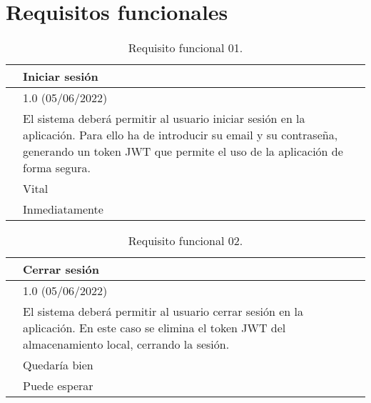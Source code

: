 \section{Requisitos funcionales}
\label{APRequisitosFuncionales}

\begin{table}[H]
\begin{center}
\begin{tabular}{|p{3cm}|p{10cm}|} \hline
\centering {\bf FRQ-01} & Iniciar sesión  \\ \hline\hline
\centering {\bf Versión} & 1.0 (05/06/2022) \\ \hline
\centering {\bf Descripción} & El sistema deberá permitir al usuario iniciar sesión en la aplicación. Para ello ha de introducir su email y su contraseña, generando un token JWT que permite el uso de la aplicación de forma segura. \\ \hline
\centering {\bf Importancia} & Vital \\ \hline
\centering {\bf Urgencia} & Inmediatamente \\ \hline
\end{tabular}
\caption{Requisito funcional 01.}
\label{enlaceFRQ1}
\end{center}
\end{table}

\begin{table}[H]
\begin{center}
\begin{tabular}{|p{3cm}|p{10cm}|} \hline
\centering {\bf FRQ-02} & Cerrar sesión  \\ \hline\hline
\centering {\bf Versión} & 1.0 (05/06/2022) \\ \hline
\centering {\bf Descripción} & El sistema deberá permitir al usuario cerrar sesión en la aplicación. En este caso se elimina el token JWT del almacenamiento local, cerrando la sesión. \\ \hline
\centering {\bf Importancia} & Quedaría bien \\ \hline
\centering {\bf Urgencia} & Puede esperar \\ \hline
\end{tabular}
\caption{Requisito funcional 02.}
\label{enlaceFRQ2}
\end{center}
\end{table}

